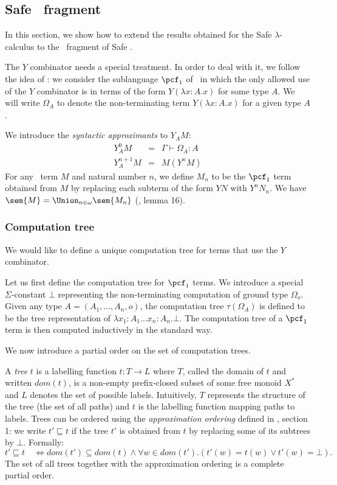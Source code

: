 \subsection{Safe \pcf\ fragment}
In this section, we show how to extend the results obtained for the
Safe $\lambda$-calculus to the \pcf\ fragment of Safe \ialgol.

The $Y$ combinator needs a special treatment. In order to deal with it, we follow the idea of \cite{abramsky:game-semantics-tutorial}:
we consider the sublanguage $\pcf_1$ of \pcf\ in which the only allowed use of the $Y$ combinator is in terms of the form $Y( \lambda x:A .x )$ for some type $A$.
We will write $\Omega_A$ to denote the non-terminating term $Y(\lambda x:A .x)$ for a given type $A$.

We introduce the \emph{syntactic approximants} to $Y_A M$:
\begin{eqnarray*}
Y^0_A M &=& \Gamma \vdash \Omega_A : A\\
Y^{n+1}_A M &=& M( Y^n M )
\end{eqnarray*}
For any \pcf\ term $M$ and natural number $n$, we define $M_n$ to be the $\pcf_1$ term obtained from $M$ by replacing each subterm of the form $Y N$
with $Y^n N_n$.
We have $\sem{M} = \Union_{n\in\omega} \sem{M_n}$ (\cite{abramsky:game-semantics-tutorial}, lemma 16).


\subsubsection{Computation tree}

We would like to define a unique computation tree for terms that use the $Y$ combinator.

Let us first define the computation tree for $\pcf_1$ terms.
We introduce a special $\Sigma$-constant $\bot$ representing the non-terminating computation
of ground type $\Omega_o$. Given any type $A = (A_1, \ldots, A_n, o)$, the computation tree $\tau(\Omega_A)$ is
defined to be the tree representation of $\lambda x_1:A_1 \ldots x_n:A_n . \bot$.
The computation tree of a $\pcf_1$ term is then computed inductively in the standard way.

We now introduce a partial order on the set of computation trees.

A \emph{tree} $t$ is a labelling function $t:T\rightarrow L$ where
$T$, called the domain of $t$ and written $dom(t)$, is a non-empty prefix-closed subset of some free monoid $X^*$
and $L$ denotes the set of possible labels.
Intuitively, $T$ represents the structure of the tree (the set of all paths) and $t$ is the labelling function mapping paths to labels.
Trees can be ordered using the \emph{approximation ordering} defined in \cite{KNU02}, section 1:
we write $t' \sqsubseteq t$ if the tree $t'$ is obtained from $t$ by replacing some of its subtrees by $\bot$. Formally:
$$t' \sqsubseteq t \quad \iff dom(t') \subseteq dom(t) \wedge \forall  w \in dom(t'). (t'(w) = t(w) \vee t'(w) = \bot).$$
The set of all trees together with the approximation ordering is a complete partial order.


